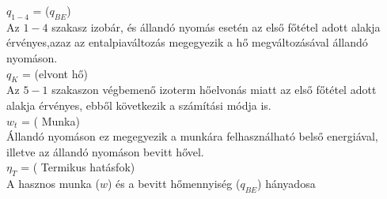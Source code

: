 $q_{1-4}$ =  ($q_{BE}$)\\
Az $1-4$ szakasz izobár, és állandó nyomás esetén az első főtétel adott alakja érvényes,azaz az entalpiaváltozás megegyezik a hő megváltozásával állandó nyomáson.\\
$q_K$ = (elvont hő)\\
Az $5-1$ szakaszon végbemenő izoterm hőelvonás miatt az első főtétel adott alakja érvényes, ebből következik a számítási módja is. \\
$w_t$ = ( Munka)\\
Állandó nyomáson ez megegyezik a munkára felhasználható belső
energiával, illetve az állandó nyomáson bevitt hővel.\\
$\eta_T$ = ( Termikus hatásfok)\\
A hasznos munka ($w$) és a bevitt hőmennyiség ($q_{BE}$) hányadosa